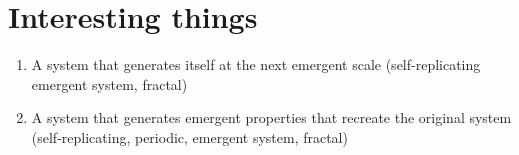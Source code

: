 \documentclass{article}
\begin{document}
\section{Interesting things}

  \begin{enumerate}[label=\textbf{\alph*)}]
    \item A system that generates itself at the next emergent scale (self-replicating emergent system, fractal)
    \item A system that generates emergent properties that recreate the original system (self-replicating, periodic, emergent system, fractal)
  \end{enumerate}
\end{document}
